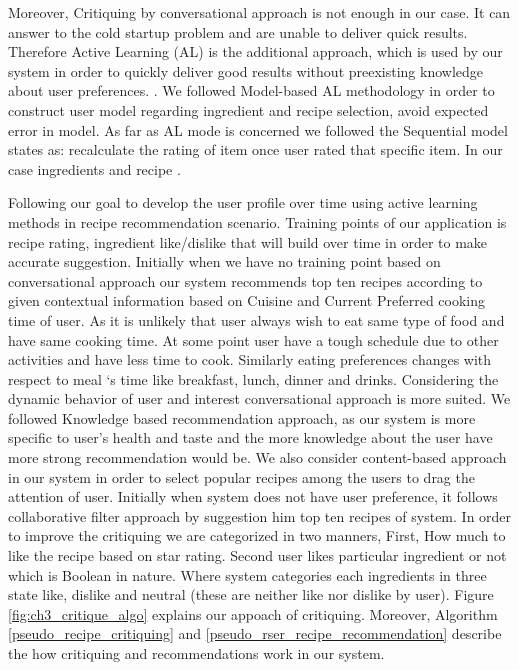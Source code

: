 Moreover, Critiquing by conversational approach is not enough in our case. It can answer to the cold startup problem and are unable to deliver quick results. Therefore Active Learning (AL) is the additional approach, which is used by our system in order to quickly deliver good results without preexisting knowledge about user preferences. \cite{lamche2014active}. We followed Model-based AL methodology in order to construct user model regarding ingredient and recipe selection, avoid expected error in model. As far as AL mode is concerned we followed the Sequential model states as: recalculate the rating of item once user rated that specific item. In our case ingredients and recipe \cite{rashid2008learning}.\newline

Following our goal to develop the user profile over time using active learning methods in recipe recommendation scenario. Training points of our application is recipe rating, ingredient like/dislike that will build over time in order to make accurate suggestion. Initially when we have no training point based on conversational approach our system recommends top ten recipes according to given contextual information based on Cuisine and Current Preferred cooking time of user. As it is unlikely that user always wish to eat same type of food and have same cooking time. At some point user have a tough schedule due to other activities and have less time to cook. Similarly eating preferences changes with respect to meal ‘s time like breakfast, lunch, dinner and drinks. Considering the dynamic behavior of user and interest conversational approach is more suited. We followed Knowledge based recommendation approach, as our system is more specific to user’s health and taste and the more knowledge about the user have more strong recommendation would be. We also consider content-based approach in our system in order to select popular recipes among the users to drag the attention of user. Initially when system does not have user preference, it follows collaborative filter approach by suggestion him top ten recipes of system. In order to improve the critiquing we are categorized in two manners, First, How much to like the recipe based on star rating. Second user likes particular ingredient or not which is Boolean in nature. Where system categories each ingredients in three state like, dislike and neutral (these are neither like nor dislike by user). Figure \ref{fig:ch3_critique_algo} explains our appoach of critiquing. Moreover, Algorithm \ref{pseudo_recipe_critiquing}  and \ref{pseudo_rser_recipe_recommendation} describe  the how critiquing and recommendations work in our system.  
